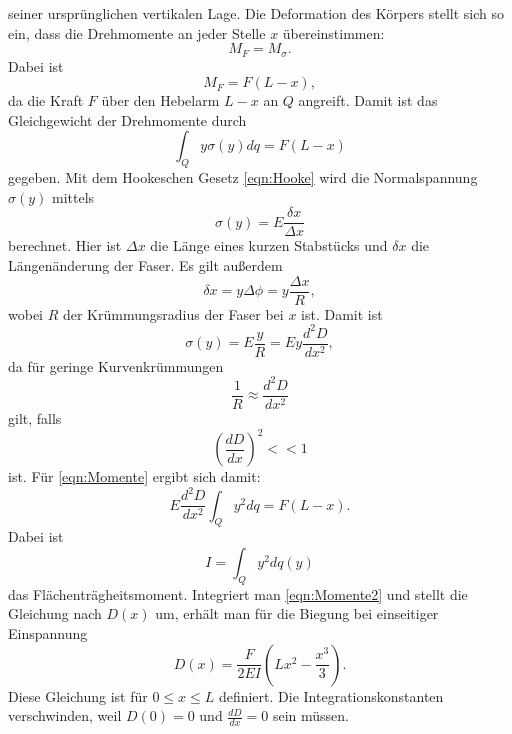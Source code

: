 seiner ursprünglichen vertikalen Lage.
Die Deformation des Körpers stellt sich so ein, dass die Drehmomente an
jeder Stelle $x$ übereinstimmen:
\begin{equation*}
M_{F} = M_{\sigma}.
\end{equation*}
Dabei ist
\begin{equation*}
M_{F} = F (L-x),
\end{equation*}
da die Kraft $F$ über den Hebelarm $L-x$ an $Q$ angreift.
Damit ist das Gleichgewicht der Drehmomente durch
\begin{equation}
\int_{Q} y \sigma(y) dq = F(L-x)
\label{eqn:Momente}
\end{equation}
gegeben.
Mit dem Hookeschen Gesetz \eqref{eqn:Hooke} wird die Normalspannung
$\sigma(y)$ mittels
\begin{equation*}
\sigma(y) = E \frac{\delta x}{\Delta x}
\end{equation*}
berechnet. Hier ist $\Delta x$ die Länge eines kurzen Stabstücks
und $\delta x$ die Längenänderung der Faser.
Es gilt außerdem
\begin{equation*}
\delta x = y \Delta \phi = y \frac{\Delta x}{R},
\end{equation*}
wobei $R$ der Krümmungsradius der Faser bei $x$ ist.
Damit ist
\begin{equation*}
\sigma(y) = E \frac{y}{R} = E y \frac{d^2D}{dx^2},
\end{equation*}
da für geringe Kurvenkrümmungen
\begin{equation*}
\frac{1}{R} \approx \frac{d^2D}{dx^2}
\end{equation*}
gilt, falls
\begin{equation*}
(\frac{dD}{dx})^2 << 1
\end{equation*}
ist. Für \eqref{eqn:Momente} ergibt sich damit:
\begin{equation}
E \frac{d^2D}{dx^2} \int_{Q} y^2 dq = F(L-x).
\label{eqn:Momente2}
\end{equation}
Dabei ist
\begin{equation*}
I = \int_{Q} y^2 dq(y)
\end{equation*}
das Flächenträgheitsmoment.
Integriert man \eqref{eqn:Momente2} und stellt die Gleichung
nach $D(x)$ um, erhält man für die Biegung bei einseitiger Einspannung
\begin{equation}
D(x) = \frac{F}{2EI} (Lx^2- \frac{x^3}{3}).
\label{eqn:D1}
\end{equation}
Diese Gleichung ist für $0 \leq x \leq L$ definiert.
Die Integrationskonstanten verschwinden, weil $D(0) = 0$ und $\frac{dD}{dx} = 0$ sein müssen.

